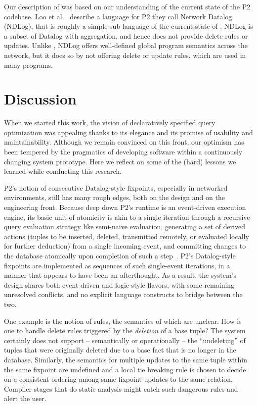 Our description of \OVERLOG was based on our understanding of the current state of the P2 codebase.  Loo et al.~\cite{loo-sigmod06} describe a language for P2 they call Network Datalog (NDLog), that is roughly a simple sub-language of the current state of \OVERLOG.  NDLog is a subset of Datalog with aggregation, and hence does not provide delete rules or updates.  Unlike \OVERLOG, NDLog offers well-defined global program semantics across the network, but it does so by not offering delete or update rules, which are used in many \OVERLOG programs.


\section{Discussion}
\label{ch:evita:sec:discussion}

When we started this work, the vision of declaratively specified query optimization was appealing 
thanks to its elegance and its promise of usability and maintainability.  Although we remain convinced 
on this front, our optimism has been tempered by the pragmatics of developing software within a
continuously changing system prototype. Here we reflect on some of the (hard) lessons we learned 
while conducting this research.

P2's notion of consecutive Datalog-style fixpoints, especially in networked environments, still has 
many rough edges, both on the design and on the engineering front.  Because deep down P2's runtime 
is an event-driven execution engine, its basic unit of atomicity is akin to a single iteration 
through a recursive query evaluation strategy like semi-naive evaluation, generating a set of 
derived actions (tuples to be inserted, deleted, transmitted remotely, or evaluated locally for 
further deduction) from a single incoming event, and committing changes to the database atomically 
upon completion of such a step~\cite{LuThesis}. P2's Datalog-style fixpoints are implemented as 
sequences of such single-event iterations, in a manner that appears to have been an afterthought. 
As a result, the system's design shares both event-driven and logic-style flavors, with some 
remaining unresolved conflicts, and no explicit language constructs to bridge between the two.

One example is the notion of  rules, the semantics of which are unclear.  How is one to 
handle delete rules triggered by the \emph{deletion} of a base tuple?  The system certainly does 
not support -- semantically or operationally -- the ``undeleting'' of tuples that were
originally deleted due to a base fact that is no longer in the database.  Similarly, the semantics 
for multiple updates to the same tuple within the same fixpoint are undefined and a local tie
breaking rule is chosen to decide on a consistent ordering among same-fixpoint updates to the 
same relation. Compiler stages that do static analysis might catch such dangerous rules and alert the user.

